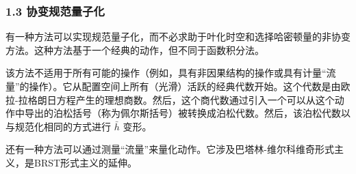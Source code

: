 \subsubsection{1.3 协变规范量子化}
有一种方法可以实现规范量子化，而不必求助于叶化时空和选择哈密顿量的非协变方法。这种方法基于一个经典的动作，但不同于函数积分法。

该方法不适用于所有可能的操作（例如，具有非因果结构的操作或具有计量“流量”的操作）。它从配置空间上所有（光滑）活跃的经典代数开始。这个代数是由欧拉-拉格朗日方程产生的理想商数。然后，这个商代数通过引入一个可以从这个动作中导出的泊松括号（称为佩尔斯括号）被转换成泊松代数。然后，该泊松代数以与规范化相同的方式进行 $\bar{h}$ 变形。


还有一种方法可以通过测量“流量”来量化动作。它涉及巴塔林-维尔科维奇形式主义，是BRST形式主义的延伸。




